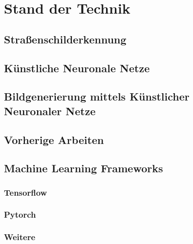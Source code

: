 \chapter{Stand der Technik}
\section{Straßenschilderkennung}


\section{Künstliche Neuronale Netze}


\section{Bildgenerierung mittels Künstlicher Neuronaler Netze}


%

\section{Vorherige Arbeiten}


\section{Machine Learning Frameworks}
\subsection{Tensorflow}
\subsection{Pytorch}
\subsection{Weitere}
